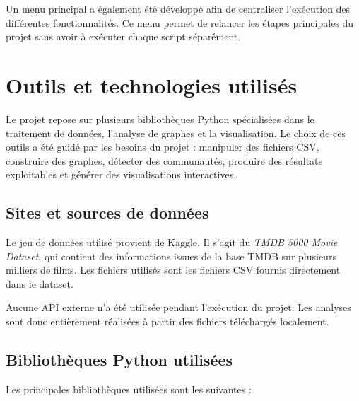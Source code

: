 \documentclass[11pt,a4paper,oneside,openany]{report}
\begin{document}
Un menu principal a également été développé afin de centraliser l’exécution des différentes fonctionnalités. Ce menu permet de relancer les étapes principales du projet sans avoir à exécuter chaque script séparément.

\chapter{Outils et technologies utilisés}

Le projet repose sur plusieurs bibliothèques Python spécialisées dans le traitement de données, l’analyse de graphes et la visualisation. Le choix de ces outils a été guidé par les besoins du projet : manipuler des fichiers CSV, construire des graphes, détecter des communautés, produire des résultats exploitables et générer des visualisations interactives.

\section{Sites et sources de données}

Le jeu de données utilisé provient de Kaggle. Il s’agit du \textit{TMDB 5000 Movie Dataset}, qui contient des informations issues de la base TMDB sur plusieurs milliers de films. Les fichiers utilisés sont les fichiers CSV fournis directement dans le dataset.

Aucune API externe n’a été utilisée pendant l’exécution du projet. Les analyses sont donc entièrement réalisées à partir des fichiers téléchargés localement.

\section{Bibliothèques Python utilisées}

Les principales bibliothèques utilisées sont les suivantes :
\end{document}
